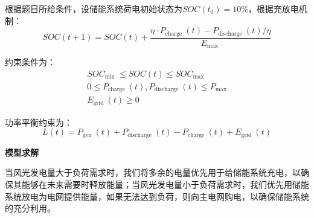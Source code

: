 \documentclass{cumcmthesis}
\begin{document}
根据题目所给条件，设储能系统荷电初始状态为$S O C\left(t_0\right)=10 \%$，根据充放电机制：
\begin{equation}
S O C(t+1)=S O C(t)+\frac{\eta \cdot P_{\text {charge }}(t)-P_{\text {discharge }}(t) / \eta}{E_{\text {max }}}
\end{equation}


约束条件为：
\begin{equation}
\begin{gathered}
S O C_{\text {min }} \leq S O C(t) \leq S O C_{\text {max }} \\
0 \leq P_{\text {charge }}(t), P_{\text {discharge }}(t) \leq P_{\max } \\
E_{\text {grid }}(t) \geq 0
\end{gathered}
\end{equation}

功率平衡约束为：
\begin{equation}
L(t)=P_{\text {gen }}(t)+P_{\text {discharge }}(t)-P_{\text {charge }}(t)+E_{\text {grid }}(t)
\end{equation}


\textbf{模型求解} 
 
当风光发电量大于负荷需求时，我们将多余的电量优先用于给储能系统充电，以确保其能够在未来需要时释放能量；当风光发电量小于负荷需求时，我们优先用储能系统放电为电网提供能量，如果无法达到负荷，则向主电网购电，以确保储能系统的充分利用。
\end{document}
